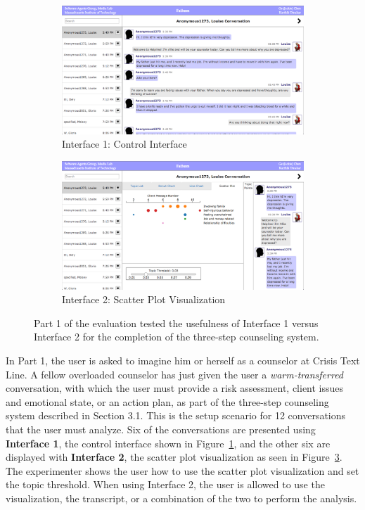 \begin{figure}[h]
  \centering
    \begin{subfigure}[h]{0.8\textwidth}
      \includegraphics[width=\textwidth]{interface1.png}
      \caption{Interface 1: Control Interface}
      \label{interface1}
      \vspace{3mm}
    \end{subfigure}
    \begin{subfigure}[h]{0.8\textwidth}
      \includegraphics[width=\textwidth]{interface2.png}
      \caption{Interface 2: Scatter Plot Visualization}
      \label{interface2}
    \end{subfigure}
  \caption{Part 1 of the evaluation tested the usefulness of Interface 1 versus Interface
  2 for the completion of the three-step counseling system.}
\end{figure}

In Part 1, the user is asked to imagine him or herself as a counselor at Crisis Text Line.
A fellow overloaded counselor has just given the user a \textit{warm-transferred}
conversation, with which the user must provide a risk assessment, client issues and
emotional state, or an action plan, as part of the three-step counseling system
described in Section 3.1. This is the setup scenario for 12 conversations that the user
must analyze. Six of the conversations are presented using \textbf{Interface 1}, the control
interface shown in Figure~\ref{interface1}, and the other six are displayed with \textbf{Interface 2}, the
scatter plot visualization as seen in Figure~\ref{interface2}. The experimenter shows the user
how to use the scatter plot visualization and set the topic threshold. When using
Interface 2, the user is allowed to use the visualization, the transcript, or a combination
of the two to perform the analysis.

